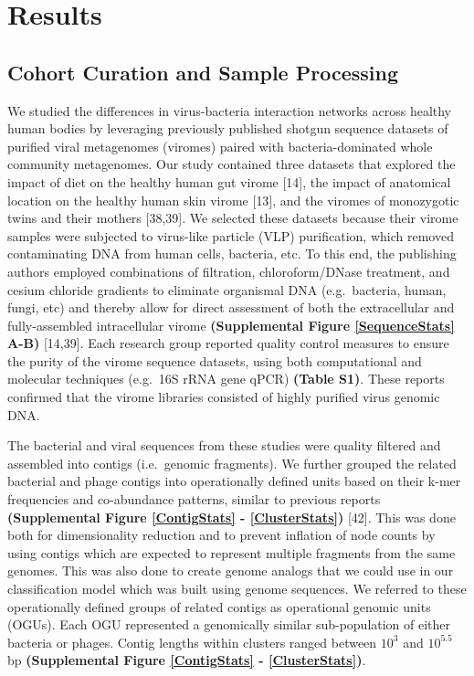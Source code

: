 \documentclass[12pt,]{article}
\begin{document}
\section{Results}\label{results}

\subsection{Cohort Curation and Sample
Processing}\label{cohort-curation-and-sample-processing}

We studied the differences in virus-bacteria interaction networks across
healthy human bodies by leveraging previously published shotgun sequence
datasets of purified viral metagenomes (viromes) paired with
bacteria-dominated whole community metagenomes. Our study contained
three datasets that explored the impact of diet on the healthy human gut
virome {[}14{]}, the impact of anatomical location on the healthy human
skin virome {[}13{]}, and the viromes of monozygotic twins and their
mothers {[}38,39{]}. We selected these datasets because their virome
samples were subjected to virus-like particle (VLP) purification, which
removed contaminating DNA from human cells, bacteria, etc. To this end,
the publishing authors employed combinations of filtration,
chloroform/DNase treatment, and cesium chloride gradients to eliminate
organismal DNA (e.g.~bacteria, human, fungi, etc) and thereby allow for
direct assessment of both the extracellular and fully-assembled
intracellular virome \textbf{(Supplemental Figure \ref{SequenceStats}
A-B)} {[}14,39{]}. Each research group reported quality control measures
to ensure the purity of the virome sequence datasets, using both
computational and molecular techniques (e.g.~16S rRNA gene qPCR)
\textbf{(Table S1)}. These reports confirmed that the virome libraries
consisted of highly purified virus genomic DNA.

The bacterial and viral sequences from these studies were quality
filtered and assembled into contigs (i.e.~genomic fragments). We further
grouped the related bacterial and phage contigs into operationally
defined units based on their k-mer frequencies and co-abundance
patterns, similar to previous reports \textbf{(Supplemental Figure
\ref{ContigStats} - \ref{ClusterStats})} {[}42{]}. This was done both
for dimensionality reduction and to prevent inflation of node counts by
using contigs which are expected to represent multiple fragments from
the same genomes. This was also done to create genome analogs that we
could use in our classification model which was built using genome
sequences. We referred to these operationally defined groups of related
contigs as operational genomic units (OGUs). Each OGU represented a
genomically similar sub-population of either bacteria or phages. Contig
lengths within clusters ranged between \(10^{3}\) and \(10^{5.5}\) bp
\textbf{(Supplemental Figure \ref{ContigStats} - \ref{ClusterStats})}.
\end{document}
